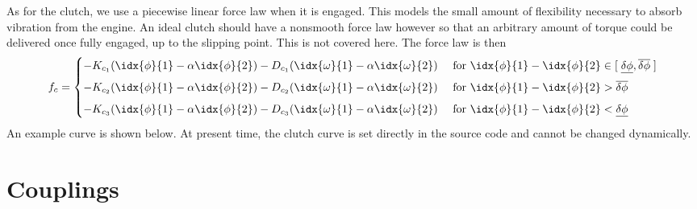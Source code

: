 \documentclass[10pt,notitlepage,abstracton]{scrartcl}
\theoremstyle{plain}
\theoremstyle{plain}
\theoremstyle{plain}
\begin{document}
As for the clutch, we use a piecewise linear force law when it is engaged.
This models the small amount of flexibility necessary to absorb vibration
from the engine.  An ideal clutch should have a nonsmooth force law however
so that an arbitrary amount of torque could be delivered once fully
engaged, up to the slipping point.  This is not covered here.  The force
law is then
\begin{equation}
  \label{eq:2}
  f_{c} =
  \begin{cases}
     -K_{c_{1}} (\idx{\phi}{1} - \alpha\idx{\phi}{2})
     -D_{c_{1}}(\idx{\omega}{1}  - \alpha\idx{\omega}{2})  & \text{ for }
    \idx{\phi}{1}-\idx{\phi}{2}
    \in[\;\underline{\delta\phi},\overline{\delta\phi}\;] \\[0.5em]
     -K_{c_{2}} (\idx{\phi}{1} - \alpha\idx{\phi}{2})
     -D_{c_{2}}(\idx{\omega}{1}  - \alpha\idx{\omega}{2})  & \text{ for }
    \idx{\phi}{1}-\idx{\phi}{2}
    >\overline{\delta\phi} \\[0.5em]
     -K_{c_{3}} (\idx{\phi}{1} - \alpha\idx{\phi}{2})
     -D_{c_{3}}(\idx{\omega}{1}  - \alpha\idx{\omega}{2})  & \text{ for }
    \idx{\phi}{1}-\idx{\phi}{2}
    <\underline{\delta\phi}
  \end{cases}
\end{equation}
An example curve is shown below.   At present time, the clutch curve is set
directly in the source code and cannot be changed dynamically.



\section{Couplings}
\label{sec:couplings}
\end{document}
